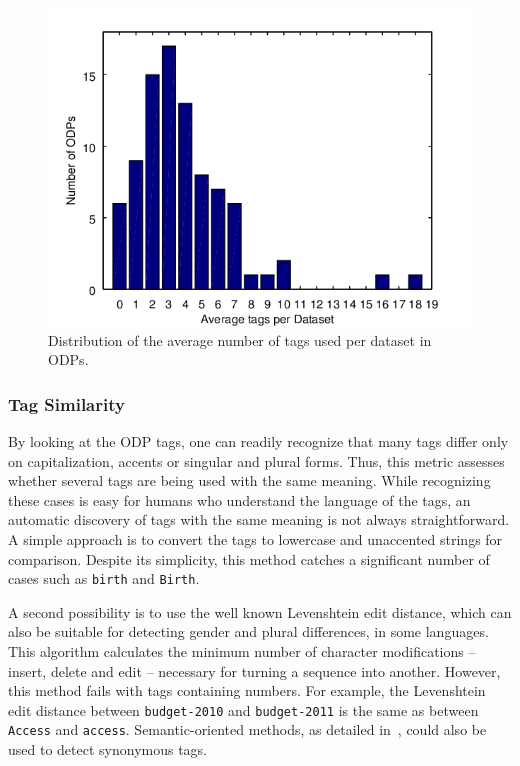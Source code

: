 \begin{figure}[tb]
\begin{center}
\includegraphics[width=\columnwidth]{images/tags_per_dataset.png}
\caption[Average number of tags per dataset.]{Distribution of the average number of tags used per dataset in ODPs.}
\label{fig:tags_per_ds}
\end{center}
\end{figure}

\subsubsection{Tag Similarity}
By looking at the ODP tags, one can readily recognize that many tags differ only on capitalization, accents or singular and plural forms.
Thus, this metric assesses whether several tags are being used with the same meaning.
While recognizing these cases is easy for humans who understand the language of the tags, an automatic discovery of tags with the same meaning is not always straightforward.
A simple approach is to convert the tags to lowercase and unaccented strings for comparison. 
Despite its simplicity, this method catches a significant number of cases such as \texttt{birth} and \texttt{Birth}.

A second possibility is to use the well known Levenshtein edit distance, which can also be suitable for detecting gender and plural differences, in some languages. 
This algorithm calculates the minimum number of character modifications -- insert, delete and edit -- necessary for turning a sequence into another. 
However, this method fails with tags containing numbers. 
For example, the Levenshtein edit distance between \texttt{budget-2010} and \texttt{budget-2011} is the same as between \texttt{Access} and \texttt{access}.
Semantic-oriented methods, as detailed in~, could also be used to detect synonymous tags.

